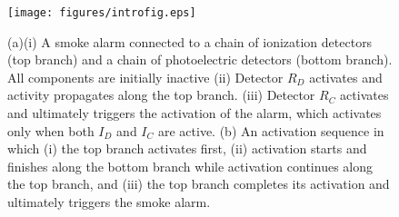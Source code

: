\documentclass[10pt,letterpaper]{article}
\newcommand{\ev}[2]{$#1_#2$}
\begin{document}

\begin{figure}
\begin{center}
\texttt{[image: figures/introfig.eps]}
\end{center}
\caption{(a)(i) A smoke alarm connected to a chain of ionization detectors (top branch) and a chain of photoelectric detectors (bottom branch). All components are initially inactive (ii) Detector \ev{R}{D} activates and activity propagates along the top branch. (iii) Detector \ev{R}{C} activates and ultimately triggers the activation of the alarm, which activates only when both  \ev{I}{D} and \ev{I}{C} are active. (b) An activation sequence in which (i) the top branch activates first, (ii) activation starts and finishes along the bottom branch while activation continues along the top branch, and (iii) the top branch completes its activation and ultimately triggers the smoke alarm.}
\label{fig:intro}
\end{figure}
\end{document}
